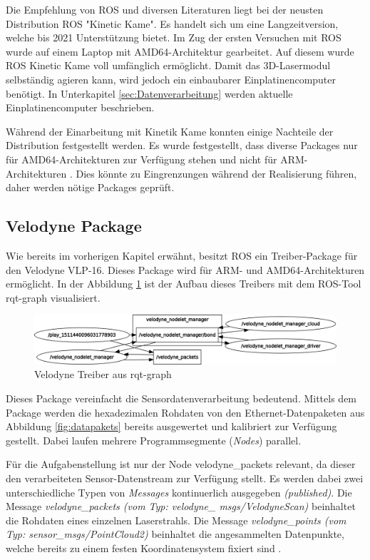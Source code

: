 Die Empfehlung von ROS und diversen Literaturen liegt bei der neusten Distribution ROS "Kinetic Kame". \cite{ROSprojects} Es handelt sich um eine Langzeitversion, welche bis 2021 Unterstützung bietet. Im Zug der ersten Versuchen mit ROS wurde auf einem Laptop mit \ac{AMD64}-Architektur gearbeitet. Auf diesem wurde ROS Kinetic Kame voll umfänglich ermöglicht. Damit das 3D-Lasermodul selbständig agieren kann, wird jedoch ein einbaubarer Einplatinencomputer benötigt. In Unterkapitel \ref{sec:Datenverarbeitung} werden aktuelle Einplatinencomputer beschrieben. 

Während der Einarbeitung mit Kinetik Kame konnten einige Nachteile der Distribution festgestellt werden. Es wurde festgestellt, dass diverse Packages nur für \ac{AMD64}-Architekturen zur Verfügung stehen und nicht für \ac{ARM}-Architekturen \cite{armhf_issues}. Dies könnte zu Eingrenzungen während der Realisierung führen, daher werden nötige Packages geprüft.
\newpage
\subsection{Velodyne Package}
Wie bereits im vorherigen Kapitel erwähnt, besitzt ROS ein Treiber-Package für den Velodyne VLP-16. Dieses Package wird für ARM- und AMD64-Architekturen ermöglicht. In der Abbildung \ref{fig:rosgraph} ist der Aufbau dieses Treibers mit dem ROS-Tool rqt-graph visualisiert. 

\begin{figure}[H]
	\centering
	\includegraphics[width=1\textwidth]{resources/rosgraph.png}
	\caption[Velodyne Treiber aus rqt-graph ]{Velodyne Treiber aus rqt-graph}
	\label{fig:rosgraph}
\end{figure} 

Dieses Package vereinfacht die Sensordatenverarbeitung bedeutend. Mittels dem Package werden die hexadezimalen Rohdaten von den Ethernet-Datenpaketen aus Abbildung \ref{fig:datapakets} bereits ausgewertet und kalibriert zur Verfügung gestellt. Dabei laufen mehrere Programmsegmente (\textit{Nodes}) parallel. 

Für die Aufgabenstellung ist nur der Node velodyne\_packets relevant, da dieser den verarbeiteten Sensor-Datenstream zur Verfügung stellt. Es werden dabei zwei unterschiedliche Typen von \textit{Messages} kontinuerlich ausgegeben \textit{(published)}. Die Message \textit{velodyne\_packets (vom Typ: velodyne\_ msgs/VelodyneScan)} beinhaltet die Rohdaten eines einzelnen Laserstrahls. Die Message \textit{velodyne\_points (vom Typ: sensor\_msgs/PointCloud2)} beinhaltet die angesammelten Datenpunkte, welche bereits zu einem festen Koordinatensystem fixiert sind \cite{ROSvelodyne}.

